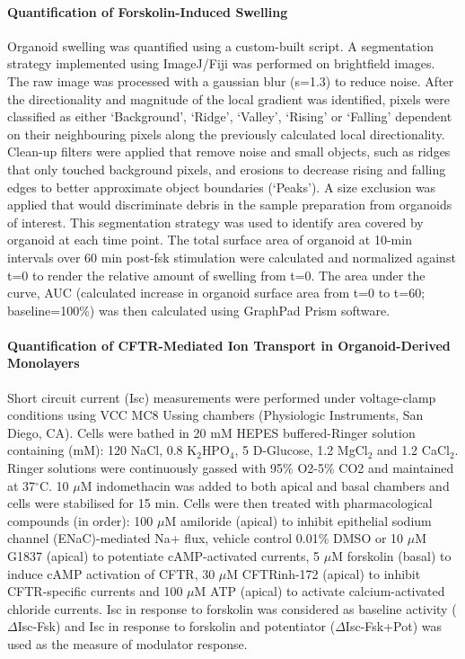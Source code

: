 \paragraph{Quantification of Forskolin-Induced Swelling} Organoid swelling was quantified using a custom-built script. A segmentation strategy implemented using ImageJ/Fiji was performed on brightfield images. The raw image was processed with a gaussian blur (s=1.3) to reduce noise. After the directionality and magnitude of the local gradient was identified, pixels were classified as either ‘Background’, ‘Ridge’, ‘Valley’, ‘Rising’ or ‘Falling’ dependent on their neighbouring pixels along the previously calculated local directionality. Clean-up filters were applied that remove noise and small objects, such as ridges that only touched background pixels, and erosions to decrease rising and falling edges to better approximate object boundaries (‘Peaks’). A size exclusion was applied that would discriminate debris in the sample preparation from organoids of interest. This segmentation strategy was used to identify area covered by organoid at each time point. The total surface area of organoid at 10-min intervals over 60 min post-fsk stimulation were calculated and normalized against t=0 to render the relative amount of swelling from t=0. The area under the curve, AUC (calculated increase in organoid surface area from t=0 to t=60; baseline=100\%) was then calculated using GraphPad Prism software.

\paragraph{Quantification of CFTR-Mediated Ion Transport in Organoid-Derived Monolayers} Short circuit current (Isc) measurements were performed under voltage-clamp conditions using VCC MC8 Ussing chambers (Physiologic Instruments, San Diego, CA). Cells were bathed in 20 mM HEPES buffered-Ringer solution containing (mM): 120 NaCl, 0.8 K$_2$HPO$_4$, 5 D-Glucose, 1.2 MgCl$_2$ and 1.2 CaCl$_2$. Ringer solutions were continuously gassed with 95\% O2-5\% CO2 and maintained at 37$^\circ$C. 10 $\mu$M indomethacin was added to both apical and basal chambers and cells were stabilised for 15 min. Cells were then treated with pharmacological compounds (in order): 100 $\mu$M amiloride (apical) to inhibit epithelial sodium channel (ENaC)-mediated Na+ flux, vehicle control 0.01\% DMSO or 10 $\mu$M G1837 (apical) to potentiate cAMP-activated currents, 5 $\mu$M forskolin (basal) to induce cAMP activation of CFTR, 30 $\mu$M CFTRinh-172 (apical) to inhibit CFTR-specific currents and 100 $\mu$M ATP (apical) to activate calcium-activated chloride currents. Isc in response to forskolin was considered as baseline activity ($\Delta$Isc-Fsk) and Isc in response to forskolin and potentiator ($\Delta$Isc-Fsk+Pot) was used as the measure of modulator response.


